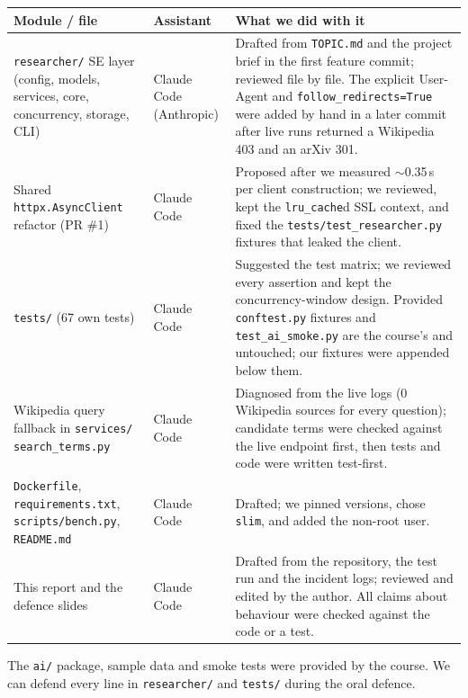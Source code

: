 \documentclass[11pt,a4paper]{article}
\begin{document}
\begin{center}\small
\begin{tabularx}{\textwidth}{@{}>{\RaggedRight\arraybackslash}p{3.9cm} >{\RaggedRight\arraybackslash}p{2.1cm} X@{}}
\toprule
\textbf{Module / file} & \textbf{Assistant} & \textbf{What we did with it} \\
\midrule
\texttt{researcher/} SE layer (config, models, services, core, concurrency, storage, CLI) & Claude Code (Anthropic) & Drafted from \texttt{TOPIC.md} and the project brief in the first feature commit; reviewed file by file. The explicit User-Agent and \texttt{follow\_redirects=True} were added by hand in a later commit after live runs returned a Wikipedia 403 and an arXiv 301. \\
Shared \texttt{httpx.AsyncClient} refactor (PR \#1) & Claude Code & Proposed after we measured $\sim$0.35\,s per client construction; we reviewed, kept the \texttt{lru\_cache}d SSL context, and fixed the \texttt{tests/test\_researcher.py} fixtures that leaked the client. \\
\texttt{tests/} (67 own tests) & Claude Code & Suggested the test matrix; we reviewed every assertion and kept the concurrency-window design. Provided \texttt{conftest.py} fixtures and \texttt{test\_ai\_smoke.py} are the course's and untouched; our fixtures were appended below them. \\
Wikipedia query fallback in \texttt{services/} \texttt{search\_terms.py} & Claude Code & Diagnosed from the live logs (0 Wikipedia sources for every question); candidate terms were checked against the live endpoint first, then tests and code were written test-first. \\
\texttt{Dockerfile}, \texttt{requirements.txt}, \texttt{scripts/bench.py}, \texttt{README.md} & Claude Code & Drafted; we pinned versions, chose \texttt{slim}, and added the non-root user. \\
This report and the defence slides & Claude Code & Drafted from the repository, the test run and the incident logs; reviewed and edited by the author. All claims about behaviour were checked against the code or a test. \\
\bottomrule
\end{tabularx}
\end{center}

The \texttt{ai/} package, sample data and smoke tests were provided by the course. We can defend every line in \texttt{researcher/} and \texttt{tests/} during the oral defence.
\end{document}
